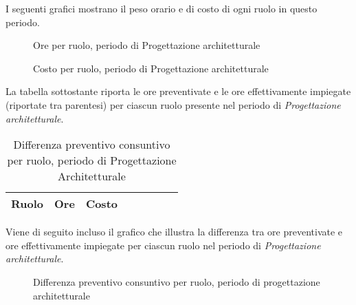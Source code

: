 I seguenti grafici mostrano il peso orario e di costo di ogni ruolo in questo periodo.

\begin{figure}[H]
\begin{tikzpicture}

	

\end{tikzpicture}
\caption{Ore per ruolo, periodo di Progettazione architetturale}
\end{figure}

\begin{figure}[H]
\begin{tikzpicture}

	

\end{tikzpicture}
\caption{Costo per ruolo, periodo di Progettazione architetturale}
\end{figure}

La tabella sottostante riporta le ore preventivate e le ore effettivamente impiegate (riportate tra parentesi) per ciascun ruolo presente nel periodo di \textit{Progettazione architetturale}.

\begin{table}[H]
\centering
\begin{tabular}{lccccccc}
\toprule
    \textbf{Ruolo}  & \textbf{Ore} & \textbf{Costo} \\
    \midrule
    
    	
    
    \bottomrule
\end{tabular}
\caption{Differenza preventivo consuntivo per ruolo, periodo di Progettazione Architetturale}
\end{table}

Viene di seguito incluso il grafico che illustra la differenza tra ore preventivate e ore effettivamente impiegate per ciascun ruolo nel periodo di \textit{Progettazione architetturale}.

\begin{figure}[H]
\centering
{}
\caption{Differenza preventivo consuntivo per ruolo, periodo di progettazione architetturale}
\end{figure}

